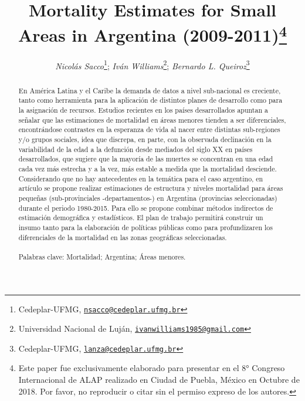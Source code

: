 \documentclass[12pt,spanish,]{article}
\title{\large{Mortality Estimates for Small Areas in Argentina (2009-2011)}\footnote{Este
  paper fue exclusivamente elaborado para presentar en el 8° Congreso
  Internacional de ALAP realizado en Ciudad de Puebla, México en Octubre
  de 2018. Por favor, no reproducir o citar sin el permiso expreso de
  los autores.} \vspace{0.5cm}}
\author{\normalsize \emph{Nicolás Sacco}\footnote{Cedeplar-UFMG,
  \href{mailto:nsacco@cedeplar.ufmg.br}{\nolinkurl{nsacco@cedeplar.ufmg.br}}};
\emph{Iván Williams}\footnote{Universidad Nacional de Luján,
  \href{mailto:ivanwilliams1985@gmail.com}{\nolinkurl{ivanwilliams1985@gmail.com}}};
\emph{Bernardo L. Queiroz}\footnote{Cedeplar-UFMG,
  \href{mailto:lanza@cedeplar.ufmg.br}{\nolinkurl{lanza@cedeplar.ufmg.br}}}}
\date{}
\begin{document}
\maketitle




\renewcommand{\abstractname}{Resumen}

\begin{abstract}
\setlength{\parindent}{2pt}
\noindent
En América Latina y el Caribe la demanda de datos a nivel sub-nacional es creciente, tanto como herramienta para la aplicación de distintos planes de desarrollo como para la asignación de recursos. Estudios recientes en los países desarrollados apuntan a señalar que las estimaciones de mortalidad en áreas menores tienden a ser diferenciales, encontrándose contrastes en la esperanza de vida al nacer entre distintas sub-regiones y/o grupos sociales, idea que discrepa, en parte, con la observada declinación en la variabilidad de la edad a la defunción desde mediados del siglo XX en países desarrollados, que sugiere que la mayoría de las muertes se concentran en una edad cada vez más estrecha y a la vez, más estable a medida que la mortalidad desciende. Considerando que no hay antecedentes en la temática para el caso argentino, en artículo se propone realizar estimaciones de estructura y niveles mortalidad para áreas pequeñas (sub-provinciales -departamentos-) en Argentina (provincias seleccionadas) durante el periodo 1980-2015. Para ello se propone combinar métodos indirectos de estimación demográfica y estadísticos. El plan de trabajo permitirá construir un insumo tanto para la elaboración de políticas públicas como para profundizaren los diferenciales de la mortalidad en las zonas geográficas seleccionadas. 
\\\\
Palabras clave: Mortalidad; Argentina; Áreas menores.
\end{abstract}
\end{document}
